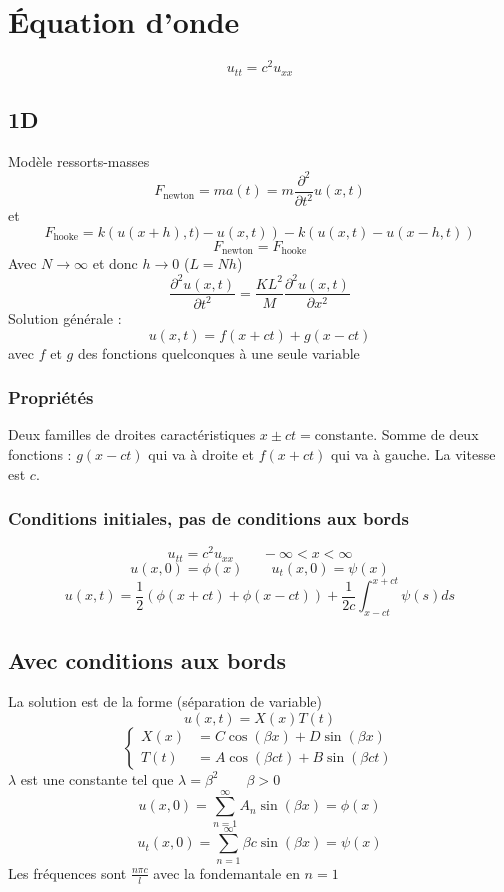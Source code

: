 \documentclass[resume]{subfiles}
\begin{document}
\section{Équation d'onde}
$$\boxed{u_{tt}=c^2u_{xx}}$$
\subsection{1D}
Modèle ressorts-masses
$$F_\text{newton}=ma(t)=m\frac{\partial^2}{\partial t^2}u(x,t)$$
et
$$F_\text{hooke}=k\left(u(x+h),t)-u(x,t)\right)-k\left(u(x,t)-u(x-h,t)\right)$$
$$F_\text{newton}=F_\text{hooke}$$
Avec $N\to\infty$ et donc $h\to 0$ ($L=Nh$)
$$\frac{\partial^2 u(x,t)}{\partial t^2}=\frac{KL^2}{M}\frac{\partial^2 u(x,t)}{\partial x^2}$$
Solution générale :
$$\boxed{u(x,t)=f(x+ct)+g(x-ct)}$$
avec $f$ et $g$ des fonctions quelconques à une seule variable
\subsubsection{Propriétés}
Deux familles de droites caractéristiques $x\pm ct=\text{constante}$. Somme de deux fonctions : $g(x-ct)$ qui va à droite et $f(x+ct)$ qui va à gauche. La vitesse est $c$.
\subsubsection{Conditions initiales, pas de conditions aux bords}
$$u_{tt}=c^2u_{xx}\qquad -\infty<x<\infty$$
$$u(x,0)=\phi(x)\qquad u_t(x,0)=\psi(x)$$
$$u(x,t)=\frac{1}{2}\left(\phi(x+ct)+\phi(x-ct)\right)+\frac{1}{2c}\int_{x-ct}^{x+ct}\psi(s)ds$$
\subsection{Avec conditions aux bords}
La solution est de la forme (séparation de variable)
$$u(x,t)=X(x)T(t)$$
$$\begin{cases}X(x)&=C\cos(\beta x)+D\sin(\beta x)\\T(t) &= A\cos(\beta ct)+B\sin(\beta ct)\end{cases}$$
$\lambda$ est une constante tel que $\lambda=\beta^2\qquad \beta>0$
$$u(x,0)=\sum_{n=1}^{\infty}A_n\sin\left(\beta x\right)=\phi(x)$$
$$u_t(x,0)=\sum_{n=1}^{\infty}\beta c\sin\left(\beta x\right)=\psi(x)$$
Les fréquences sont $\frac{n\pi c}{l}$ avec la fondemantale en $n=1$
\end{document}
